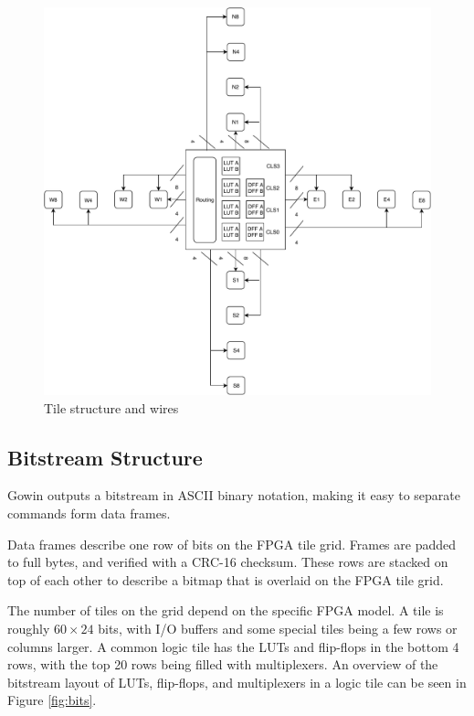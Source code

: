 \documentclass{article}
\begin{document}
\begin{figure}
    \centering
    \includegraphics[width=\textwidth]{fig/clu.pdf}
    \caption{Tile structure and wires}
    \label{fig:wiring}
\end{figure}

\subsection{Bitstream Structure}

Gowin outputs a bitstream in ASCII binary notation, making it easy to separate commands form data frames.

Data frames describe one row of bits on the FPGA tile grid. Frames are padded to full bytes, and verified with a CRC-16 checksum. These rows are stacked on top of each other to describe a bitmap that is overlaid on the FPGA tile grid.

The number of tiles on the grid depend on the specific FPGA model. A tile is roughly $60\times24$ bits, with I/O buffers and some special tiles being a few rows or columns larger. A common logic tile has the LUTs and flip-flops in the bottom 4 rows, with the top 20 rows being filled with multiplexers. An overview of the bitstream layout of LUTs, flip-flops, and multiplexers in a logic tile can be seen in Figure \ref{fig:bits}.
\end{document}
